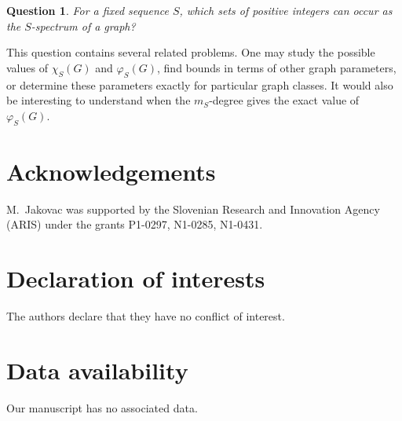 \documentclass{article}
\newtheorem{question}{Question}
\theoremstyle{definition}
\begin{document}
\begin{question} For a fixed sequence $S$, which sets of positive integers can occur as the $S$-spectrum of a graph?
\end{question}

This question contains several related problems. One may study the possible values of $\chi_S(G)$ and $\varphi_S(G)$, find bounds in terms of other graph parameters, or determine these parameters exactly for particular graph classes. It would also be interesting to understand when the $m_S$-degree gives the exact value of $\varphi_S(G)$.

\section*{Acknowledgements}

M.\ Jakovac was supported by the Slovenian Research and Innovation Agency (ARIS) under the grants  P1-0297, N1-0285, N1-0431.

\section*{Declaration of interests}
 
The authors declare that they have no conflict of interest. 

\section*{Data availability}
 
Our manuscript has no associated data.
\end{document}
